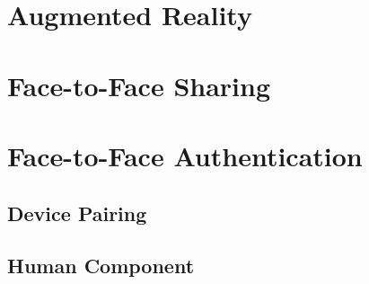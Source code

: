 \documentclass[12pt]{report}
\begin{document}
\section{Augmented Reality}



\section{Face-to-Face Sharing}


\section{Face-to-Face Authentication}
\subsection{Device Pairing}

\subsection{Human Component}
\end{document}
